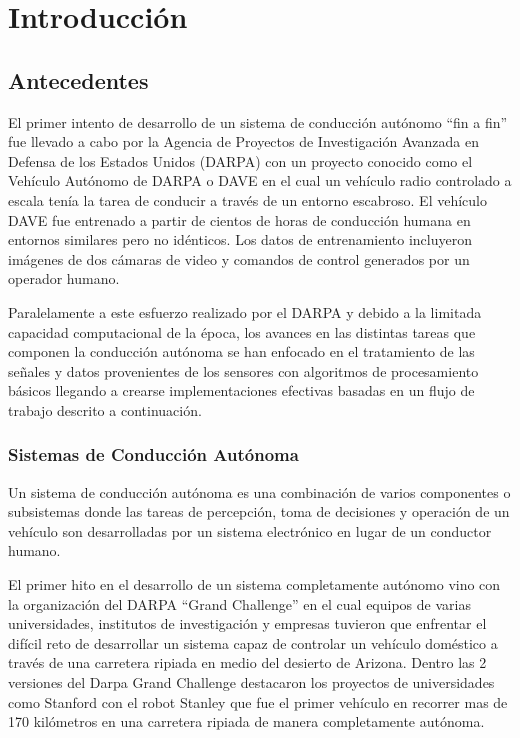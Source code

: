 \chapter{Introducción} \label{ch:introduccion}

\section{Antecedentes}

El primer intento de desarrollo de un sistema de conducción autónomo “fin a fin” fue llevado a cabo por la Agencia 
de Proyectos de Investigación Avanzada en Defensa de los Estados Unidos (DARPA) con un proyecto conocido 
como el Vehículo Autónomo de DARPA o DAVE \cite{lecun2004dave} en el cual un vehículo radio controlado a escala tenía la 
tarea de conducir a través de un entorno escabroso. El vehículo DAVE fue entrenado a partir de cientos de
horas de conducción humana en entornos similares pero no idénticos. Los datos de entrenamiento 
incluyeron imágenes de dos cámaras de video y comandos de control generados por un operador humano. 

Paralelamente a este esfuerzo realizado por el DARPA y debido a la limitada capacidad computacional de la época, 
los avances en las distintas tareas que componen la conducción autónoma se han enfocado en el tratamiento de las señales 
y datos provenientes de los sensores con algoritmos de procesamiento básicos llegando a crearse implementaciones efectivas 
basadas en un flujo de trabajo descrito a continuación.

\subsection{Sistemas de Conducción Autónoma}
Un sistema de conducción autónoma es una combinación de varios componentes o subsistemas donde las tareas 
de percepción, toma de decisiones y operación de un vehículo son desarrolladas por un sistema electrónico en lugar
de un conductor humano. 

El primer hito en el desarrollo de un sistema completamente autónomo vino 
con la organización del DARPA “Grand Challenge” en el cual equipos de varias universidades, 
institutos de investigación y empresas tuvieron que enfrentar el difícil reto de desarrollar 
un sistema capaz de controlar un vehículo doméstico a través de una carretera 
ripiada en medio del desierto de Arizona. Dentro las 2 versiones del Darpa Grand Challenge 
destacaron los proyectos de universidades como Stanford con el robot Stanley \cite{Thrun2006} que fue el primer 
vehículo en recorrer mas de 170 kilómetros en una carretera ripiada de manera completamente autónoma. 

